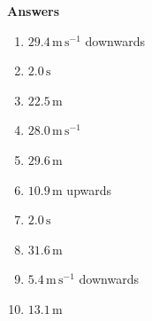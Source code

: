 \documentclass[11pt,a4paper]{article}
\begin{document}
\newpage

\begin{center}
    {\LARGE \textbf{Answers}}
\end{center}

\begin{enumerate}[leftmargin=*, itemsep=1em]

    \item \(29.4\,\mathrm{m\,s^{-1}}\) downwards

    \item \(2.0\,\mathrm{s}\)

    \item \(22.5\,\mathrm{m}\)

    \item \(28.0\,\mathrm{m\,s^{-1}}\)

    \item \(29.6\,\mathrm{m}\)

    \item \(10.9\,\mathrm{m}\) upwards

    \item \(2.0\,\mathrm{s}\)

    \item \(31.6\,\mathrm{m}\)

    \item \(5.4\,\mathrm{m\,s^{-1}}\) downwards

    \item \(13.1\,\mathrm{m}\)

\end{enumerate}
\end{document}
